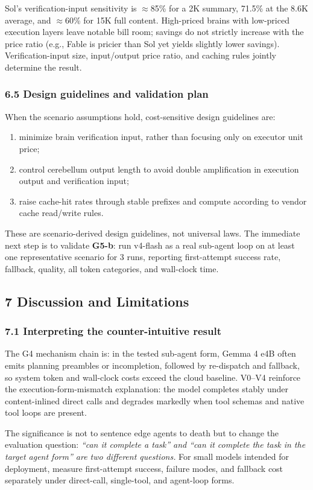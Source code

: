 \documentclass[
]{article}
\begin{document}
Sol's verification-input sensitivity is $\approx$85\% for a 2K summary, 71.5\% at the 8.6K average, and $\approx$60\% for 15K full content. High-priced brains with low-priced execution layers leave notable bill room; savings do not strictly increase with the price ratio (e.g., Fable is pricier than Sol yet yields slightly lower savings). Verification-input size, input/output price ratio, and caching rules jointly determine the result.

\subsubsection{6.5 Design guidelines and validation plan}
When the scenario assumptions hold, cost-sensitive design guidelines are:
\begin{enumerate}
\item minimize brain verification input, rather than focusing only on executor unit price;
\item control cerebellum output length to avoid double amplification in execution output and verification input;
\item raise cache-hit rates through stable prefixes and compute according to vendor cache read/write rules.
\end{enumerate}
These are scenario-derived design guidelines, not universal laws. The immediate next step is to validate \textbf{G5-b}: run v4-flash as a real sub-agent loop on at least one representative scenario for 3 runs, reporting first-attempt success rate, fallback, quality, all token categories, and wall-clock time.

\subsection{7 Discussion and Limitations}
\subsubsection{7.1 Interpreting the counter-intuitive result}
The G4 mechanism chain is: in the tested sub-agent form, Gemma 4 e4B often emits planning preambles or incompletion, followed by re-dispatch and fallback, so system token and wall-clock costs exceed the cloud baseline. V0--V4 reinforce the execution-form-mismatch explanation: the model completes stably under content-inlined direct calls and degrades markedly when tool schemas and native tool loops are present.

The significance is not to sentence edge agents to death but to change the evaluation question: \emph{``can it complete a task'' and ``can it complete the task in the target agent form'' are two different questions.} For small models intended for deployment, measure first-attempt success, failure modes, and fallback cost separately under direct-call, single-tool, and agent-loop forms.
\end{document}
